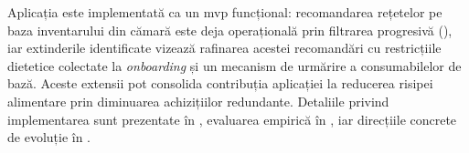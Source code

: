 Aplicația este implementată ca un \gls{mvp} funcțional: recomandarea rețetelor pe baza inventarului din cămară este deja operațională prin filtrarea progresivă (), iar extinderile identificate vizează rafinarea acestei recomandări cu restricțiile dietetice colectate la \textit{onboarding} și un mecanism de urmărire a consumabilelor de bază.
Aceste extensii pot consolida contribuția aplicației la reducerea risipei alimentare prin diminuarea achizițiilor redundante.
Detaliile privind implementarea sunt prezentate în , evaluarea empirică în , iar direcțiile concrete de evoluție în .

